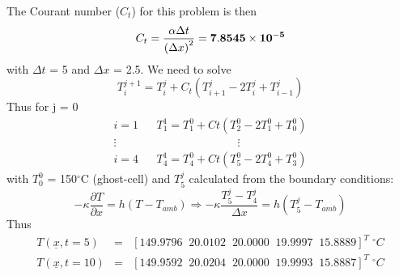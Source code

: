 \documentclass[calculator,steamtables,datasheet,solutions]{exam}
\newcommand{\frc}{\displaystyle\frac}
\begin{document}
\begin{question}
\begin{enumerate}
{The Courant number ($C_{t}$) for this problem is then~
\begin{displaymath}
   C_{t} = \frc{\alpha \Delta t}{\left(\Delta x\right)^{2}} = {\bf 7.8545\times 10^{-5}}
\end{displaymath}
with $\Delta t$ = 5 and $\Delta x$ = 2.5. We need to solve
\begin{displaymath}
    T_{i}^{j+1} = T_{i}^{j} + C_{t}\left(T_{i+1}^{j}-2T_{i}^{j}+T_{i-1}^{j}\right)
\end{displaymath}
Thus for j = 0~
\begin{eqnarray}
    i=1 && T_{1}^{1} = T_{1}^{0} + Ct\left(T_{2}^{0}-2T_{1}^{0}+T_{0}^{0}\right) \nonumber \\
     \vdots && \hspace{3cm} \vdots \nonumber \\
    i=4 && T_{4}^{1} = T_{4}^{0} + Ct\left(T_{5}^{0}-2T_{4}^{0}+T_{3}^{0}\right) \nonumber
\end{eqnarray}
with $T_{0}^{0}$ = 150$^{\circ}$C (ghost-cell) and $T_{5}^{j}$ calculated from the boundary conditions:~
\begin{displaymath}
-\kappa\frc{\partial T}{\partial x} = h\left(T-T_{amb}\right)\Longrightarrow -\kappa \frc{T^{j}_{5}-T^{j}_{4}}{\Delta x} = h\left(T_{5}^{j}-T_{amb}\right)
\end{displaymath}
Thus~
{\bf \begin{eqnarray}
   T\left(\underline{x},t=5\right)  &=& \left[ 149.9796\;\; 20.0102 \;\; 20.0000\;\; 19.9997\;\; 15.8889\right]^{T}\; ^{\circ}C \nonumber \\
   T\left(\underline{x},t=10\right) &=& \left[ 149.9592\;\; 20.0204 \;\; 20.0000\;\; 19.9993\;\; 15.8887\right]^{T}\; ^{\circ}C \nonumber
\end{eqnarray}}

}

\end{enumerate}

\end{question}
\end{document}
